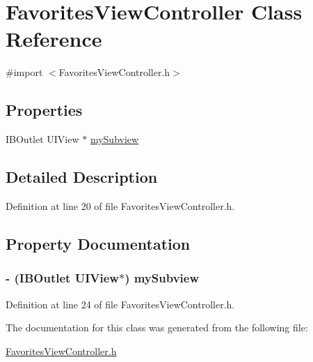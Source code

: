 \hypertarget{interface_favorites_view_controller}{
\section{FavoritesViewController Class Reference}
\label{interface_favorites_view_controller}
}


{\ttfamily \#import $<$FavoritesViewController.h$>$}

\subsection*{Properties}
\begin{DoxyCompactItemize}
\item 
IBOutlet UIView $\ast$ \hyperlink{interface_favorites_view_controller_acc52a7c4d35472a5e41a1e078081435b}{mySubview}
\end{DoxyCompactItemize}


\subsection{Detailed Description}


Definition at line 20 of file FavoritesViewController.h.



\subsection{Property Documentation}
\hypertarget{interface_favorites_view_controller_acc52a7c4d35472a5e41a1e078081435b}{
\subsubsection[{mySubview}]{\setlength{\rightskip}{0pt plus 5cm}-\/ (IBOutlet UIView$\ast$) mySubview}}
\label{interface_favorites_view_controller_acc52a7c4d35472a5e41a1e078081435b}


Definition at line 24 of file FavoritesViewController.h.



The documentation for this class was generated from the following file:\begin{DoxyCompactItemize}
\item 
\hyperlink{_favorites_view_controller_8h}{FavoritesViewController.h}\end{DoxyCompactItemize}
